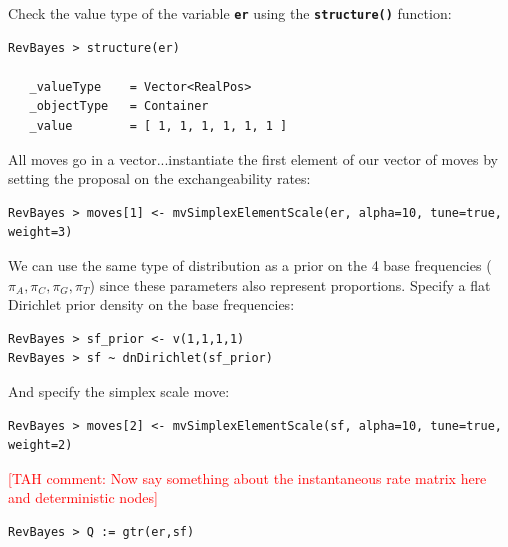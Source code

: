 \documentclass[11pt]{article}
\newcommand{\taha}[1]{{\textcolor{red}{[TAH comment: #1]}}} %
\newcommand{\cl}[1]{{\texttt{\textbf{#1}}}}
\begin{document}
Check the value type of the variable \cl{er} using the \cl{structure()} function:

{\tt \begin{snugshade*}
\begin{lstlisting}
RevBayes > structure(er)

   _valueType    = Vector<RealPos>
   _objectType   = Container
   _value        = [ 1, 1, 1, 1, 1, 1 ]
\end{lstlisting}
\end{snugshade*}}

All moves go in a vector...instantiate the first element of our vector of moves by setting the proposal on the exchangeability rates:

{\tt\small \begin{snugshade*}
\begin{lstlisting}
RevBayes > moves[1] <- mvSimplexElementScale(er, alpha=10, tune=true, weight=3) 
\end{lstlisting}
\end{snugshade*}}



We can use the same type of distribution as a prior on the 4 base frequencies ($\pi_A, \pi_C, \pi_G, \pi_T$) since these parameters also represent proportions. 
Specify a flat Dirichlet prior density on the base frequencies:

{\tt \begin{snugshade*}
\begin{lstlisting}
RevBayes > sf_prior <- v(1,1,1,1) 
RevBayes > sf ~ dnDirichlet(sf_prior)
\end{lstlisting}
\end{snugshade*}}

And specify the simplex scale move:
{\tt \small \begin{snugshade*}
\begin{lstlisting}
RevBayes > moves[2] <- mvSimplexElementScale(sf, alpha=10, tune=true, weight=2)  
\end{lstlisting}
\end{snugshade*}}

\taha{Now say something about the instantaneous rate matrix here and deterministic nodes}

{\tt \begin{snugshade*}
\begin{lstlisting}
RevBayes > Q := gtr(er,sf)
\end{lstlisting}
\end{snugshade*}}
\end{document}
